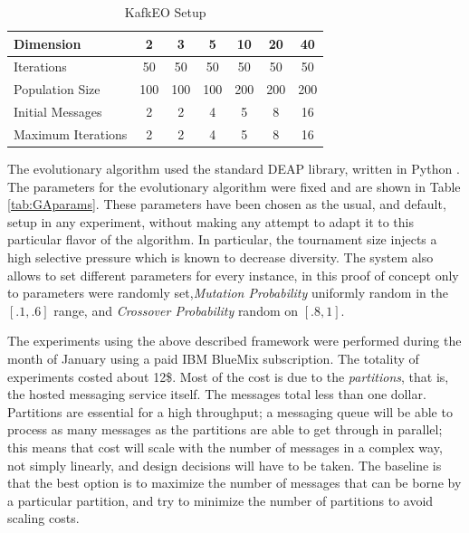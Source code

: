 \documentclass[sigconf]{acmart}
\begin{document}
\begin{table}
  \small
  \caption{KafkEO Setup}
  \label{tab:params:kafka} 
  \centering
  \small
  \begin{tabular}{|l|c|c|c|c|c|c|}
    \hline
    Dimension & 2 & 3 & 5 & 10 & 20 & 40\\ \hline
    Iterations & 50 & 50 & 50 & 50 & 50 & 50\\ \hline
    Population Size  & 100 & 100 & 100 & 200 & 200 & 200 \\ \hline
    Initial Messages & 2 & 2 & 4 & 5 & 8 & 16  \\ \hline
    Maximum Iterations & 2 & 2 & 4 & 5 & 8 & 16  \\ \hline
  \end{tabular}
\end{table}

The evolutionary algorithm used the standard DEAP library, written in
Python \cite{fortin2012deap}. The parameters for the evolutionary algorithm were fixed and
are shown in Table \ref{tab:GAparams}. These parameters have been
chosen as the usual, and default, setup in any experiment, without
making any attempt to adapt it to this particular flavor of the
algorithm. In particular, the tournament size injects a high selective
pressure which is known to decrease diversity. The system also allows 
to set different parameters for every instance, in this proof of concept 
only to parameters were randomly set,{\em Mutation Probability} uniformly  random in the $[.1,.6]$ range, and {\em Crossover Probability} random on $[.8,1]$.


The experiments using the above described framework were performed
during the month of January using a paid IBM BlueMix subscription. The
totality of experiments costed about 12\$. Most of the cost is due to
the {\em partitions}, that is, the hosted messaging service
itself. The messages total less than one dollar. 
Partitions are
essential for a high throughput; a messaging queue will be able to
process as many messages as the partitions are able to get through in
parallel; this means that cost will scale with the number of messages
in a complex way, not simply linearly, and design decisions will have
to be taken. The baseline is that the best option is to maximize the
number of messages that can be borne by a particular partition, and
try to minimize the number of partitions to avoid scaling costs. 
\end{document}
